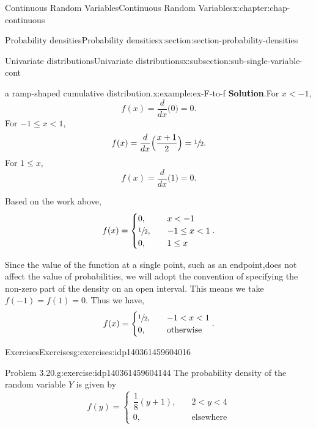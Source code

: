 \documentclass[oneside,10pt,]{book}
\newcommand{\blocktitlefont}{\relax}
\numberwithin{equation}{section}
\newcommand{\lt}{<}
\newcommand{\amp}{&}
\begin{document}
\begin{chapterptx}{Continuous Random Variables}{}{Continuous Random Variables}{}{}{x:chapter:chap-continuous}
\begin{sectionptx}{Probability densities}{}{Probability densities}{}{}{x:section:section-probability-densities}
\begin{subsectionptx}{Univariate distributions}{}{Univariate distributions}{}{}{x:subsection:sub-single-variable-cont}
\begin{example}{a ramp-shaped cumulative distribution.}{x:example:ex-F-to-f}
\textbf{\blocktitlefont Solution}.\quad{}For \(x \lt -1\),%
\begin{equation*}
f(x) = \dfrac{d}{dx}\Big(0\Big) = 0\text{.}
\end{equation*}
For \(-1 \le x \lt 1\),%
\begin{equation*}
f(x) =
\dfrac{d}{dx}\Big(\dfrac{x+1}{2}\Big) = \sfrac{1}{2}\text{.}
\end{equation*}
For \(1 \le x\),%
\begin{equation*}
f(x) = \dfrac{d}{dx}\Big(1\Big) = 0\text{.}
\end{equation*}
%
\par
Based on the work above,%
\begin{equation*}
f(x) = \begin{cases}0, \amp \quad x \lt
-1\\\sfrac{1}{2}, \amp \quad -1 \le x \lt 1\\ 0, \amp \quad 1 \le
x\end{cases}\text{.}
\end{equation*}
%
\par
Since the value of the function at a single point, such as an endpoint,does not affect the value of probabilities, we will adopt the convention of specifying the non-zero part of the density on an open interval.  This means we take \(f(-1)=f(1)=0\). Thus we have,%
\begin{equation*}
f(x) = \begin{cases}\sfrac{1}{2}, \amp \quad -1 \lt x \lt 1\\ 0,
\amp \quad
\text{otherwise}\end{cases}\text{.}
\end{equation*}
%
\end{example}
\end{subsectionptx}
%
%
\typeout{************************************************}
\typeout{************************************************}
%
\begin{exercises-subsection}{Exercises}{}{Exercises}{}{}{g:exercises:idp140361459604016}
\begin{divisionexercise}{1}{Problem 3.20.}{}{g:exercise:idp140361459604144}%
The probability density of the random variable \(Y\) is given by%
\begin{equation*}
f(y) = \begin{cases} \dfrac{1}{8}(y+1), \amp \quad 2 \lt y \lt 4\\
0, \amp \quad \text{elsewhere}\end{cases}

\end{equation*}
\end{divisionexercise}
\end{exercises-subsection}
\end{sectionptx}
\end{chapterptx}
\end{document}

